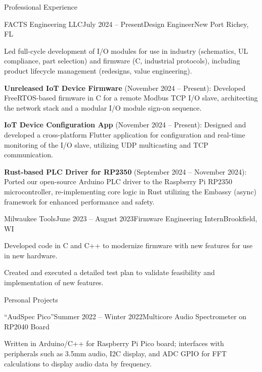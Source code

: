 \documentclass[
	11pt, %
]{resume} %
\begin{document}
\begin{rSection}{Professional Experience}

    \begin{rSubsection}{FACTS Engineering LLC}{July 2024 -- Present}{Design Engineer}{New Port Richey, FL}
		\item Led full-cycle development of I/O modules for use in industry (schematics, UL compliance, part selection) and firmware (C, industrial protocols), including product lifecycle management (redesigns, value engineering).
		\item \textbf{Unreleased IoT Device Firmware} (November 2024 -- Present): Developed FreeRTOS-based firmware in C for a remote Modbus TCP I/O slave, architecting the network stack and a modular I/O module sign-on sequence.
		\item \textbf{IoT Device Configuration App} (November 2024 -- Present): Designed and developed a cross-platform Flutter application for configuration and real-time monitoring of the I/O slave, utilizing UDP multicasting and TCP communication.
        \item \textbf{Rust-based PLC Driver for RP2350} (September 2024 -- November 2024): Ported our open-source Arduino PLC driver to the Raspberry Pi RP2350 microcontroller, re-implementing core logic in Rust utilizing the Embassy (async) framework for enhanced performance and safety.
	\end{rSubsection}


	\begin{rSubsection}{Milwaukee Tools}{June 2023 -- August 2023}{Firmware Engineering Intern}{Brookfield, WI}
		\item Developed code in C and C++ to modernize firmware with new features for use in new hardware.
		\item Created and executed a detailed test plan to validate feasibility and implementation of new features.
	\end{rSubsection}
    
\end{rSection}


\begin{rSection}{Personal Projects}

	\begin{rSubsection}{``AudSpec Pico''}{Summer 2022 -- Winter 2022}{Multicore Audio Spectrometer on RP2040 Board}{}
		\item Written in Arduino/C++ for Raspberry Pi Pico board; interfaces with peripherals such as 3.5mm audio, I2C display, and ADC GPIO for FFT calculations to display audio data by frequency.
	\end{rSubsection}

\end{rSection}
\end{document}
